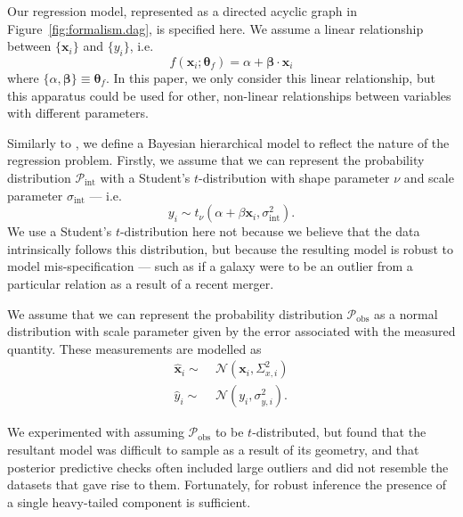 \documentclass[fleqn,usenatbib]{rasti}
\newcommand{\studentt}[2]{t_\nu \left( #1, #2 \right)}
\newcommand{\depvar}{y_i}
\newcommand{\indepvars}{\boldsymbol{x}_i}
\newcommand{\obsdep}{\hat{y}_i}
\newcommand{\obsindep}{\hat{\boldsymbol{x}}_i}
\newcommand{\indepcov}{\Sigma_{x, i}}
\newcommand{\deperr}{\sigma_{y, i}}
\newcommand{\intscttr}{\sigma_{\text{int}}}
\newcommand{\intercept}{\alpha}
\newcommand{\covariate}{\beta}
\begin{document}
Our regression model, represented as a directed acyclic graph in
Figure~\ref{fig:formalism.dag}, is specified here. We assume a linear
relationship between
$\{\boldsymbol{x}_i\}$ and $\{y_i\}$, i.e.
\begin{equation}
    f(\boldsymbol{x}_i; \boldsymbol{\theta}_f) =
        \alpha + \boldsymbol{\beta} \cdot \boldsymbol{x}_i
\end{equation}
where $\{\alpha, \boldsymbol{\beta}\} \equiv \boldsymbol{\theta}_f$. In this
paper, we only consider this linear relationship, but this apparatus could be
used for other, non-linear relationships between variables with different
parameters.

Similarly to \citet{Kelly:2007}, we define a Bayesian hierarchical model to
reflect the nature of the regression problem. Firstly, we assume that we can
represent the probability distribution $\mathcal P_{\text{int}}$ with a
Student's $t$-distribution with shape parameter $\nu$ and scale parameter
$\sigma_{\text{int}}$ --- i.e.
\begin{equation}
\depvar \sim \studentt{\intercept + \covariate \indepvars}{\intscttr^2}.
\end{equation}
We use a Student's $t$-distribution here not because we believe that the data
intrinsically follows this distribution, but because the resulting model is
robust to model mis-specification --- such as if a galaxy were
to be an outlier from a particular relation as a result of a recent merger.

We assume that we can represent the probability distribution
$\mathcal P_{\text{obs}}$ as a normal distribution with scale parameter given by
the error associated with the measured quantity. These measurements are modelled
as
\begin{align}
    \obsindep \sim&\; \mathcal N\left({\indepvars}, \indepcov^2\right) \\
    \obsdep \sim&\; \mathcal N\left({\depvar}, \deperr^2\right).
\end{align}

We experimented with assuming $\mathcal P_{\text{obs}}$ to be $t$-distributed,
but found that the resultant model was difficult to sample as a result of its
geometry, and that posterior predictive checks often included large outliers and
did not resemble the datasets that gave rise to them.  Fortunately, for robust
inference the presence of a single heavy-tailed component is sufficient.
\end{document}
